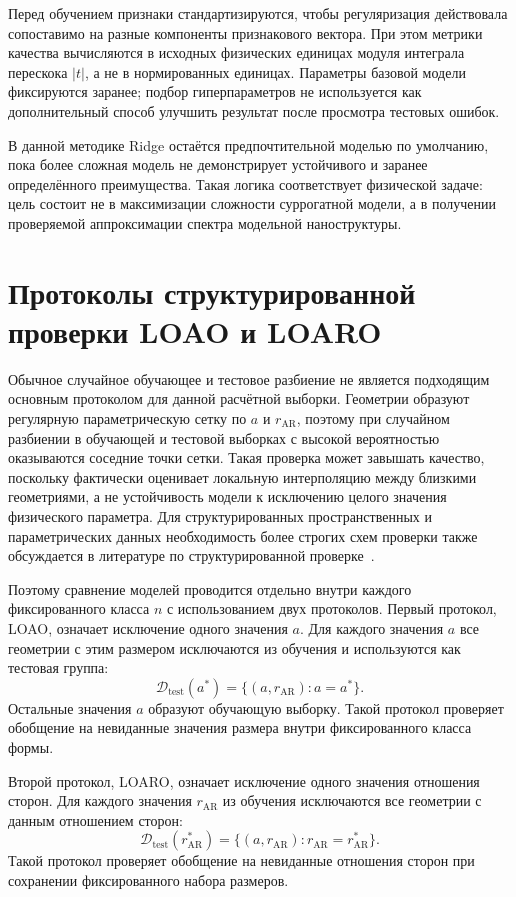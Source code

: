 Перед обучением признаки стандартизируются, чтобы регуляризация действовала сопоставимо на
разные компоненты признакового вектора. При этом метрики качества вычисляются в исходных
физических единицах модуля интеграла перескока $|t|$, а не в нормированных единицах.
Параметры базовой модели фиксируются заранее; подбор гиперпараметров не используется как
дополнительный способ улучшить результат после просмотра тестовых ошибок.

В данной методике Ridge остаётся предпочтительной моделью по умолчанию, пока более сложная
модель не демонстрирует устойчивого и заранее определённого преимущества. Такая логика
соответствует физической задаче: цель состоит не в максимизации сложности суррогатной
модели, а в получении проверяемой аппроксимации спектра модельной наноструктуры.

\section{Протоколы структурированной проверки LOAO и LOARO}

Обычное случайное обучающее и тестовое разбиение не является подходящим основным
протоколом для данной расчётной выборки. Геометрии образуют регулярную параметрическую
сетку по $a$ и $r_{\mathrm{AR}}$, поэтому при случайном разбиении в обучающей и тестовой
выборках с высокой вероятностью оказываются соседние точки сетки. Такая проверка может
завышать качество, поскольку фактически оценивает локальную интерполяцию между близкими
геометриями, а не устойчивость модели к исключению целого значения физического параметра.
Для структурированных пространственных и параметрических данных необходимость более
строгих схем проверки также обсуждается в литературе по структурированной
проверке~\cite{roberts2017crossvalidation}.

Поэтому сравнение моделей проводится отдельно внутри каждого фиксированного класса $n$ с
использованием двух протоколов. Первый протокол, LOAO, означает исключение одного значения
$a$. Для каждого значения $a$ все геометрии с этим размером исключаются из обучения и
используются как тестовая группа:
\[
  \mathcal{D}_{\mathrm{test}}(a^\ast)
  =
  \{(a,r_{\mathrm{AR}}): a=a^\ast\}.
\]
Остальные значения $a$ образуют обучающую выборку. Такой протокол проверяет обобщение на
невиданные значения размера внутри фиксированного класса формы.

Второй протокол, LOARO, означает исключение одного значения отношения сторон. Для каждого
значения $r_{\mathrm{AR}}$ из обучения исключаются все геометрии с данным отношением
сторон:
\[
  \mathcal{D}_{\mathrm{test}}(r_{\mathrm{AR}}^\ast)
  =
  \{(a,r_{\mathrm{AR}}): r_{\mathrm{AR}}=r_{\mathrm{AR}}^\ast\}.
\]
Такой протокол проверяет обобщение на невиданные отношения сторон при сохранении
фиксированного набора размеров.

